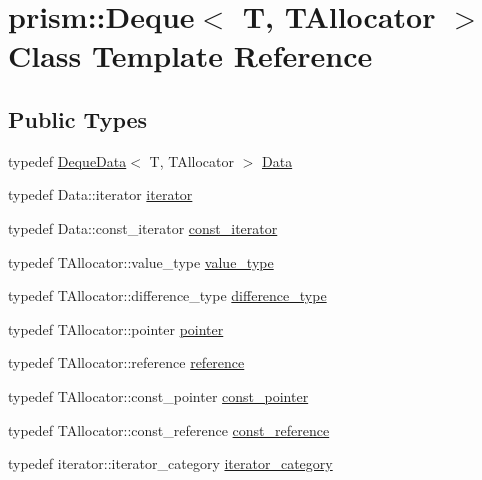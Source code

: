 \hypertarget{classprism_1_1_deque}{}\section{prism\+:\+:Deque$<$ T, T\+Allocator $>$ Class Template Reference}
\label{classprism_1_1_deque}
\subsection*{Public Types}
\begin{DoxyCompactItemize}
\item 
typedef \hyperlink{structprism_1_1_deque_data}{Deque\+Data}$<$ T, T\+Allocator $>$ \hyperlink{classprism_1_1_deque_a17bc7f491baf38861449e99635636d2f}{Data}
\item 
typedef Data\+::iterator \hyperlink{classprism_1_1_deque_a263fd8daf307719cd101c97028fe68a1}{iterator}
\item 
typedef Data\+::const\+\_\+iterator \hyperlink{classprism_1_1_deque_a264ab74c18a153ed1d225cb7b29d8f17}{const\+\_\+iterator}
\item 
typedef T\+Allocator\+::value\+\_\+type \hyperlink{classprism_1_1_deque_a04c90c07b76fc822d266d7fcea147f01}{value\+\_\+type}
\item 
typedef T\+Allocator\+::difference\+\_\+type \hyperlink{classprism_1_1_deque_a0678b4b8619b996e2b3de3b8134b6b9f}{difference\+\_\+type}
\item 
typedef T\+Allocator\+::pointer \hyperlink{classprism_1_1_deque_a6f3ced98e358577ca5730800a04184dc}{pointer}
\item 
typedef T\+Allocator\+::reference \hyperlink{classprism_1_1_deque_a035cdb869f46870d62d403d9ff5e3691}{reference}
\item 
typedef T\+Allocator\+::const\+\_\+pointer \hyperlink{classprism_1_1_deque_a569958f4e74279b18ec0964d820ebded}{const\+\_\+pointer}
\item 
typedef T\+Allocator\+::const\+\_\+reference \hyperlink{classprism_1_1_deque_affa26df70d5123f79a59386056e920c3}{const\+\_\+reference}
\item 
typedef iterator\+::iterator\+\_\+category \hyperlink{classprism_1_1_deque_a10ecd23455d0619cbe070eb91b340f37}{iterator\+\_\+category}
\end{DoxyCompactItemize}
